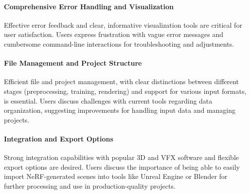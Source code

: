 
\paragraph{Comprehensive Error Handling and Visualization}
Effective error feedback and clear, informative visualization tools are critical for user satisfaction. 
Users express frustration with vague error messages and cumbersome command-line interactions for troubleshooting and adjustments. 
\cite{P2, P3}


\paragraph{File Management and Project Structure}
Efficient file and project management, with clear distinctions between different stages (preprocessing, training, rendering) and support for various input formats, is essential. 
Users discuss challenges with current tools regarding data organization, suggesting improvements for handling input data and managing projects​​.
\cite{P1, P3}

\paragraph{Integration and Export Options}
Strong integration capabilities with popular 3D and VFX software and flexible export options are desired. 
Users discuss the importance of being able to easily import NeRF-generated scenes into tools like Unreal Engine \cite{noauthor_unreal_nodate} or Blender \cite{noauthor_blender_nodate} for further processing and use in production-quality projects​​.
\cite{P1, P2, P4}

